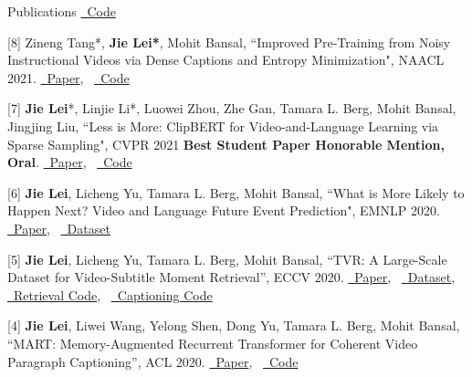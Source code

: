 \documentclass{resume} %
\begin{document}
\begin{rSection}{Publications}
{            \href{https://github.com/j-min/VL-T5}{\color{codelinkcolor}\faGithub~Code}
            }       
    \item {[8] Zineng Tang*, \textbf{Jie Lei*}, Mohit Bansal,
            ``Improved Pre-Training from Noisy Instructional Videos via Dense Captions and Entropy Minimization",
            NAACL 2021. \href{https://www.aclweb.org/anthology/2021.naacl-main.193/}{\color{codelinkcolor}\faFile~Paper},~
            \href{https://github.com/zinengtang/DeCEMBERT}{\color{codelinkcolor}\faGithub~Code}   
            }               
    \item {[7] \textbf{Jie Lei}*, Linjie Li*, Luowei Zhou, Zhe Gan, Tamara L. Berg, Mohit Bansal, Jingjing Liu,
            ``Less is More: ClipBERT for Video-and-Language Learning via Sparse Sampling",
            CVPR 2021 {\color{bittersweet}\textbf{Best Student Paper Honorable Mention, Oral}}.    
            \href{https://arxiv.org/abs/2102.06183}{\color{codelinkcolor}\faFile~Paper},~
            \href{https://github.com/jayleicn/ClipBERT}{\color{codelinkcolor}\faGithub~Code}
            }                  
    \item {[6] \textbf{Jie Lei}, Licheng Yu, Tamara L. Berg, Mohit Bansal,
            ``What is More Likely to Happen Next? Video and Language Future Event Prediction",
            EMNLP 2020.    
            \href{https://arxiv.org/abs/2010.07999}{\color{codelinkcolor}\faFile~Paper},~
            \href{https://github.com/jayleicn/VideoLanguageFuturePred}{\color{codelinkcolor}\faDatabase~Dataset}
            }    
   \item {[5] \textbf{Jie Lei}, Licheng Yu, Tamara L. Berg, Mohit Bansal,
        ``TVR: A Large-Scale Dataset for Video-Subtitle Moment Retrieval'',
            ECCV 2020. 
            \href{https://arxiv.org/abs/2001.09099}{\color{codelinkcolor}\faFile~Paper},~
            \href{https://tvr.cs.unc.edu/}{\color{codelinkcolor}\faDatabase~Dataset},~
            \href{https://github.com/jayleicn/TVRetrieval}{\color{codelinkcolor}\faGithub~Retrieval Code},~
            \href{https://github.com/jayleicn/TVCaption}{\color{codelinkcolor}\faGithub~Captioning Code}
            } 
   \item {[4] \textbf{Jie Lei}, Liwei Wang, Yelong Shen, Dong Yu, Tamara L. Berg, Mohit Bansal,
         ``MART: Memory-Augmented Recurrent Transformer for Coherent Video Paragraph Captioning'',
         ACL 2020.
         \href{https://arxiv.org/abs/2005.05402}{\color{codelinkcolor}\faFile~Paper},~
         \href{https://github.com/jayleicn/recurrent-transformer}{\color{codelinkcolor}\faGithub~Code}
}
\end{rSection}
\end{document}
